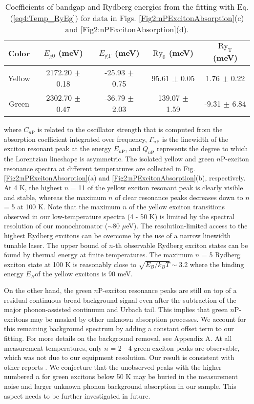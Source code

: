 \documentclass[aps,reprint,amsmath,amssymb,prb]{revtex4-1}
\begin{document}
\begin{table*}
  \caption{Coefficients of bandgap and Rydberg energies from the fitting with Eq. (\ref{eq4:Temp_RyEg}) for data in Figs. \ref{Fig2:nPExcitonAbsorption}(c) and \ref{Fig2:nPExcitonAbsorption}(d).}
    \label{tab2:EgRyCotFitRes}
\begin{ruledtabular}
  \begin{tabular}{c c c c c}  
        Color & $E_{\text{g0}}$ (meV) & $E_{\text{gT}}$ (meV) & $\text{Ry}_{\text{0}}$ (meV) & $\text{Ry}_{\text{T}}$ (meV) \\ 
        \hline
        Yellow & 2172.20  $\pm$ 0.18 & -25.93 $\pm$ 0.75 & 95.61 $\pm$ 0.05 & 1.76 $\pm$ 0.22\\  
        Green & 2302.70  $\pm$ 0.47  & -36.79 $\pm$ 2.03 & 139.07 $\pm$ 1.59 & -9.31 $\pm$ 6.84 \\  
    \end{tabular}
  \end{ruledtabular}
\end{table*}
\noindent where $C_{n\text{P}}$ is related to the oscillator strength that is computed from the absorption coefficient integrated over frequency, $\Gamma_{n\text{P}}$ is the linewidth of the exciton resonant peak at the energy $E_{n\text{P}}$, and $Q_{n\text{P}}$ represents the degree to which the Lorentzian lineshape is asymmetric.  
The isolated yellow and green $n$P-exciton resonance spectra at different temperatures are collected in Fig. \ref{Fig2:nPExcitonAbsorption}(a) and \ref{Fig2:nPExcitonAbsorption}(b), respectively. At 4 K, the highest $n$ = 11  of the yellow exciton resonant peak is clearly visible and stable, whereas the maximum $n$ of clear resonance peaks decreases down to $n$ = 5 at 100 K. Note that the maximum $n$ of the yellow exciton transitions observed in our low-temperature spectra (4 - 50 K) is limited by the spectral resolution of our monochromator ($\sim$80 $\mu$eV). The resolution-limited access to the highest Rydberg excitons can be overcome by the use of a narrow linewidth tunable laser. The upper bound of $n$-th observable Rydberg exciton states can be found by thermal energy at finite temperatures. The maximum $n$ = 5 Rydberg exciton state at 100 K is reasonably close to $\sqrt{E_B/k_BT} \sim 3.2$  where the binding energy $E_B$of the yellow excitons is 90 meV.  

On the other hand, the green $n$P-exciton resonance peaks are still on top of a residual continuous broad background signal even after the subtraction of the major phonon-assisted continuum and Urbach tail. This implies that green $n$P-excitons may be masked by other unknown absorption processes. We account for this remaining background spectrum by adding a constant offset term to our fitting. For more details on the background removal, see Appendix A. At all measurement temperatures, only $n$ = 2 - 4 green exciton peaks are observable, which was not due to our equipment resolution. Our result is consistent with other reports \cite{Itoh1975,Schone2017}.
We conjecture that the unobserved peaks with the higher numbered $n$ for green excitons below 50 K may be buried in the measurement noise and larger unknown phonon background absorption in our sample. This aspect needs to be further investigated in future.
\end{document}
